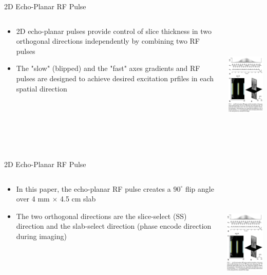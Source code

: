 \documentclass{beamer}
\begin{document}
\begin{frame}{2D Echo-Planar RF Pulse}
\begin{columns}[T]
	\begin{column}[T]{5cm}
		\begin{itemize}
			\item 2D echo-planar pulses provide control of slice thickness in two orthogonal directions independently by combining two RF pulses
			\item The "slow" (blipped) and the "fast" axes gradients and RF pulses are designed to achieve desired excitation prfiles in each spatial direction
		\end{itemize}
	\end{column}
	\begin{column}[T]{5cm}
		\includegraphics[height=6cm]{SpineDWIfig1}
	\end{column}
\end{columns}
\end{frame}

\begin{frame}{2D Echo-Planar RF Pulse}
\begin{columns}[T]
	\begin{column}[T]{5cm}
		\begin{itemize}
			\item In this paper, the echo-planar RF pulse creates a $90^{\circ}$ flip angle over 4 mm $\times$ 4.5 cm slab
			\item The two orthogonal directions are the slice-select (SS) direction and the slab-select direction (phase encode direction during imaging)
		\end{itemize}
	\end{column}
	\begin{column}[T]{5cm}
		\includegraphics[height=6cm]{SpineDWIfig1}
	\end{column}
\end{columns}
\end{frame}
\end{document}
